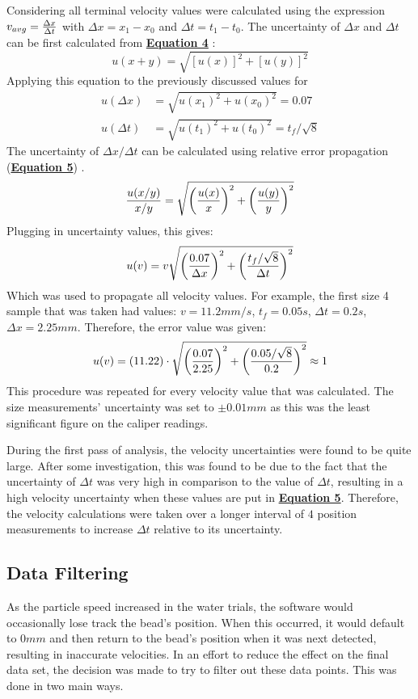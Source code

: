 \documentclass[
	letterpaper
	12pt
]{template}
\newcommand{\bref}[2]{\textbf{\hyperref[#1]{#2}}}
\begin{document}
Considering all terminal velocity values were calculated using the expression $v_{avg} = {\Delta x\over \Delta t}$ with $\Delta x = x_1 - x_0$ and $\Delta t = t_1 - t_0$. The uncertainty of $\Delta x$ and $\Delta t$ can be first calculated from \bref{eqn::sumUnc}{Equation 4} \cite{harrison_2023}:
\begin{equation}\label{eqn::sumUnc}
	u(x+y) = \sqrt{[u(x)]^2 + [u(y)]^2}
\end{equation}
Applying this equation to the previously discussed values for
\begin{align*}
	u(\Delta x) &= \sqrt{u(x_1)^2 + u(x_0)^2} = 0.07\\
	u(\Delta t) &= \sqrt{u(t_1)^2 + u(t_0)^2} = {t_f/ \sqrt 8}
\end{align*}
The uncertainty of $\Delta x/\Delta t$ can be calculated using relative error propagation (\bref{eqn::relError}{Equation 5}) \cite{harrison_2023}.
\begin{equation}\label{eqn::relError}
	{u(x/y)\over x/y} = \sqrt{\left({u(x)\over x}\right)^2+\left({u(y)\over y}\right)^2}
\end{equation}
Plugging in uncertainty values, this gives:
\[u(v) = v\sqrt{\left({0.07\over \Delta x}\right)^2+\left({t_f/\sqrt{8}\over \Delta t}\right)^2}\]
Which was used to propagate all velocity values. For example, the first size 4 sample that was taken had values: $v = 11.2mm/s$, $t_f = 0.05s$, $\Delta t = 0.2s$, $\Delta x = 2.25mm$. Therefore, the error value was given:
\[u(v) = (11.22) \cdot \sqrt{\left({0.07\over 2.25}\right)^2+\left({0.05/\sqrt{8}\over 0.2}\right)^2} \approx 1\]
This procedure was repeated for every velocity value that was calculated. The size measurements' uncertainty was set to $\pm0.01\unit{mm}$ as this was the least significant figure on the caliper readings.\vspace{\baselineskip}

During the first pass of analysis, the velocity uncertainties were found to be quite large. After some investigation, this was found to be due to the fact that the uncertainty of $\Delta t$ was very high in comparison to the value of $\Delta t$, resulting in a high velocity uncertainty when these values are put in \bref{eqn::relError}{Equation 5}. Therefore, the velocity calculations were taken over a longer interval of $4$ position measurements to increase $\Delta t$ relative to its uncertainty.
\subsection{Data Filtering}\label{sec::filtering}
As the particle speed increased in the water trials, the software would occasionally lose track the bead's position. When this occurred, it would default to $0mm$ and then return to the bead's position when it was next detected, resulting in inaccurate velocities. In an effort to reduce the effect on the final data set, the decision was made to try to filter out these data points. This was done in two main ways.\vspace{\baselineskip}
\end{document}
